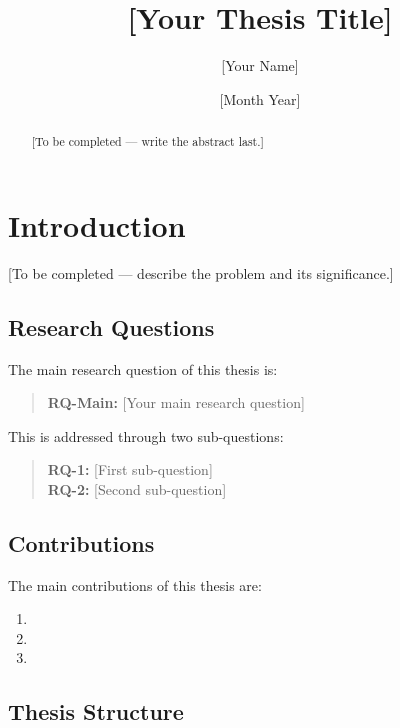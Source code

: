 \documentclass[12pt, a4paper]{report}
\title{[Your Thesis Title]}
\author{[Your Name]}
\date{[Month Year]}
\begin{document}
\maketitle
\tableofcontents
\listoffigures
\listoftables

\begin{abstract}
[To be completed — write the abstract last.]
\end{abstract}

\chapter{Introduction}
\label{ch:introduction}

[To be completed — describe the problem and its significance.]

\section{Research Questions}
\label{sec:rq}

The main research question of this thesis is:

\begin{quote}
\textbf{RQ-Main:} [Your main research question]
\end{quote}

This is addressed through two sub-questions:

\begin{quote}
\textbf{RQ-1:} [First sub-question]\\
\textbf{RQ-2:} [Second sub-question]
\end{quote}

\section{Contributions}
\label{sec:contributions}

The main contributions of this thesis are:

\begin{enumerate}
    \item [Contribution 1]
    \item [Contribution 2]
    \item [Contribution 3]
\end{enumerate}

\section{Thesis Structure}
\label{sec:structure}
\end{document}
